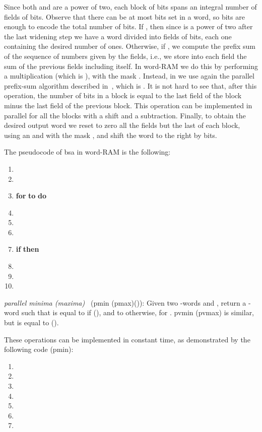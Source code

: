 \documentclass{llncs}
\def \band{\textsf{and}\xspace}
\newcommand{\fword}[1]{-word}
\begin{document}
Since both  and  are a power of two, each block of  bits spans an
integral number of fields of  bits. Observe
that there can be at most  bits set in a word, so  bits
are enough to encode the total number of bits. If ,
then since  is a power of two after the last widening step we
have a word divided into fields of  bits, each one
containing the desired number of ones. Otherwise, if ,
we compute the prefix sum of the sequence of numbers given by the
fields, i.e., we store into each field the sum of the previous fields
including itself. In word-RAM we do this by performing a
multiplication (which is ), with the mask . Instead, in  we use again the
parallel prefix-sum algorithm described in~\cite{HS1986}, which is
. It is not hard to see that, after this operation, the
number of bits in a block is equal to the last field of the block
minus the last field of the previous block. This operation can be
implemented in parallel for all the blocks with a shift and a subtraction.
Finally, to obtain the desired output word we reset to zero all the
fields but the last of each block, using an \band with the mask
,
and shift the word to the right by  bits.

The pseudocode of \textsf{bsa} in word-RAM is the following:
\begin{enumerate}
\item 
\item 
\item \textbf{for}  \textbf{to}  \textbf{do}
\item \qquad 
\item \qquad 
\item \qquad 
\item \textbf{if}  \textbf{then}
\item \qquad 
\item \qquad 
\item \qquad 
\end{enumerate}



\medskip
\noindent\emph{parallel minima (maxima)~\cite{PS1980}} (\textsf{pmin
  (pmax)}()): Given two \fword{f}s  and , return a
\fword{f}  such that  is equal to 
if  (), and to
 otherwise, for . \textsf{pvmin}
(\textsf{pvmax}) is similar, but  is equal to
 ().
\smallskip

\noindent These operations can be implemented in constant time, as demonstrated by the following code
(\textsf{pmin}):

\begin{enumerate}
\item 
\item 
\item 
\item 
\item 
\item 
\item 
\end{enumerate}
\end{document}
